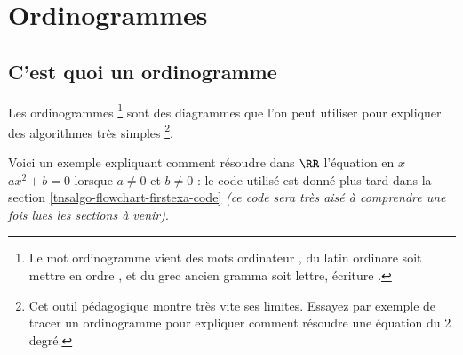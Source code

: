 \documentclass[12pt,a4paper]{article}
\begin{document}
\newpage
\section{Ordinogrammes}

\subsection{C'est quoi un ordinogramme} \label{tnsalgo-flowchart-firstexa}

Les ordinogrammes
\footnote{
    Le mot \og ordinogramme \fg{} vient des mots \og ordinateur \fg{}, du latin \og ordinare \fg{} soit \og mettre en ordre \fg{}, et du grec ancien \og gramma \fg{} soit \og lettre, écriture \fg{}.
}
sont des diagrammes que l'on peut utiliser pour expliquer des algorithmes très simples
\footnote{
    Cet outil pédagogique montre très vite ses limites. Essayez par exemple de tracer un ordinogramme pour expliquer comment résoudre une équation du 2\ieme{} degré.
}.

\medskip


Voici un exemple expliquant comment résoudre dans $\RR$ l'équation en $x$ $a x^2 + b = 0$ lorsque $a \neq 0$ et $b \neq 0$ : le code utilisé est donné plus tard dans la section \ref{tnsalgo-flowchart-firstexa-code} \emph{(ce code sera très aisé à comprendre une fois lues les sections à venir)}.

\begin{center}
    \small
    
\end{center}
\end{document}
